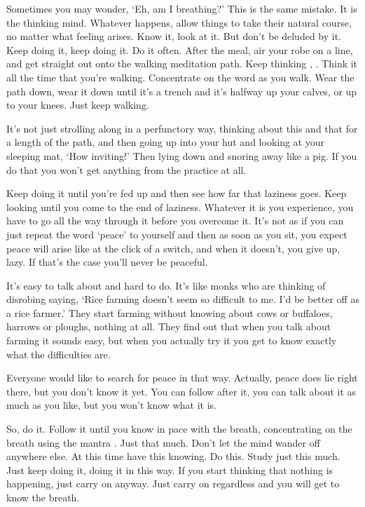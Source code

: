  Sometimes you may wonder, `Eh, am I breathing?' This is the same mistake. It is the thinking mind. Whatever happens, allow things to take their natural course, no matter what feeling arises. Know it, look at it. But don't be deluded by it. Keep doing it, keep doing it. Do it often. After the meal, air your robe on a line, and get straight out onto the walking meditation path. Keep thinking , . Think it all the time that you're walking. Concentrate on the word  as you walk. Wear the path down, wear it down until it's a trench and it's halfway up your calves, or up to your knees. Just keep walking. 

 It's not just strolling along in a perfunctory way, thinking about this and that for a length of the path, and then going up into your hut and looking at your sleeping mat, `How inviting!' Then lying down and snoring away like a pig. If you do that you won't get anything from the practice at all. 

 Keep doing it until you're fed up and then see how far that laziness goes. Keep looking until you come to the end of laziness. Whatever it is you experience, you have to go all the way through it before you overcome it. It's not as if you can just repeat the word `peace' to yourself and then as soon as you sit, you expect peace will arise like at the click of a switch, and when it doesn't, you give up, lazy. If that's the case you'll never be peaceful. 

 It's easy to talk about and hard to do. It's like monks who are thinking of disrobing saying, `Rice farming doesn't seem so difficult to me. I'd be better off as a rice farmer.' They start farming without knowing about cows or buffaloes, harrows or ploughs, nothing at all. They find out that when you talk about farming it sounds easy, but when you actually try it you get to know exactly what the difficulties are. 

 Everyone would like to search for peace in that way. Actually, peace does lie right there, but you don't know it yet. You can follow after it, you can talk about it as much as you like, but you won't know what it is. 

 So, do it. Follow it until you know in pace with the breath, concentrating on the breath using the mantra . Just that much. Don't let the mind wander off anywhere else. At this time have this knowing. Do this. Study just this much. Just keep doing it, doing it in this way. If you start thinking that nothing is happening, just carry on anyway. Just carry on regardless and you will get to know the breath. 

